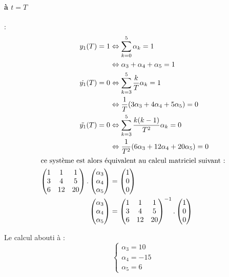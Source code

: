 \documentclass[../main.tex]{subfiles}
\begin{document}
\begin{enumerate}
\begin{enumerate}
\paragraph{à $t = T$} :
\begin{align*}
y_1(T) = 1 &\Leftrightarrow \sum_{k=0}^5 \alpha_k = 1 \\
&\Leftrightarrow \alpha_3+\alpha_4 + \alpha_5 = 1\\
\dot{y_1}(T)=0 &\Leftrightarrow  \sum_{k=3}^5 \frac{k}{T}\alpha_k = 1 \\
&\Leftrightarrow \frac{1}{T}(3\alpha_3 + 4\alpha_4 + 5 \alpha_5) = 0\\
\ddot{y_1}(T) = 0 &\Leftrightarrow \sum_{k=3}^5 \frac{k(k-1)}{T^2}\alpha_k = 0 \\
&\Leftrightarrow \frac{1}{T^2}(6\alpha_3 + 12\alpha_4 + 20\alpha_5) = 0\\
\intertext{ce système est alors équivalent au calcul matriciel suivant :}
\begin{pmatrix}1&1&1\\3&4&5\\6&12&20\end{pmatrix}.\begin{pmatrix}\alpha_3\\ \alpha_4 \\ \alpha_5\end{pmatrix} &= \begin{pmatrix}1\\0\\0 \end{pmatrix}\\
\begin{pmatrix}\alpha_3\\ \alpha_4 \\ \alpha_5\end{pmatrix} &= \begin{pmatrix}1&1&1\\3&4&5\\6&12&20\end{pmatrix}^{-1}.\begin{pmatrix}1\\0\\0 \end{pmatrix}
\end{align*}

Le calcul abouti à :
\[\left \{\begin{matrix}
\alpha_3 = 10\\
\alpha_4 = -15\\
\alpha_5 = 6
\end{matrix} \right.\]


\end{enumerate}
\end{enumerate}
\end{document}
